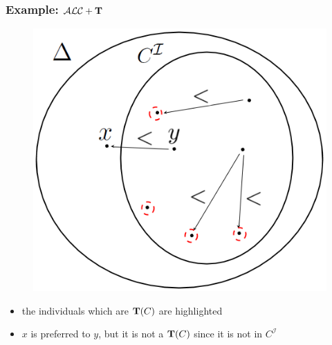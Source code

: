 \documentclass[serif,mathserif]{beamer}
\newcommand{\tip}{{\bf T}}
\newcommand{\alct}{\mathcal{ALC}+\tip}
\begin{document}
\begin{frame}
	\frametitle{Example: $\alct$}
	\begin{figure}[h]
	\centering
	\includegraphics[scale=.30]{img/diagram1_9.png}
	\end{figure}

	\begin{itemize}
	\item the individuals which are $\tip(C)$ are highlighted
	\item $x$ is preferred to $y$, but it is not a $\tip(C)$ since it is not in $C^{\mathcal{I}}$
	\end{itemize}
\end{frame}
\end{document}
